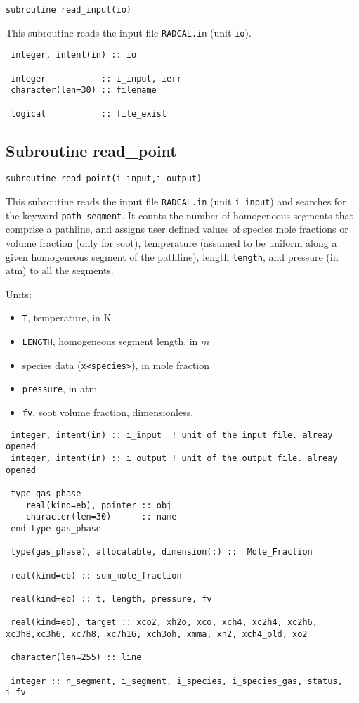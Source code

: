 \begin{lstlisting}
subroutine read_input(io)
\end{lstlisting}
 This subroutine reads the input file \verb=RADCAL.in= (unit \verb=io=).

\begin{lstlisting}
 integer, intent(in) :: io

 integer           :: i_input, ierr
 character(len=30) :: filename

 logical           :: file_exist

\end{lstlisting}

\subsection{Subroutine read\_point}
\label{sub:read_point}

\begin{lstlisting}
subroutine read_point(i_input,i_output)
\end{lstlisting}
 This subroutine reads the input file \verb=RADCAL.in= (unit \verb=i_input=) and searches for the keyword \verb=path_segment=. It counts the number of homogeneous segments that comprise a pathline, and assigns user defined values of species mole fractions or volume fraction (only for soot), temperature (assumed to be uniform along a given homogeneous segment of the pathline), length \verb=length=, and pressure (in atm) to all the segments.

 Units:
 \begin{itemize}
  \item \verb=T=, temperature, in K
  \item \verb=LENGTH=, homogeneous segment length, in $m$
  \item species data (\verb=x<species>=), in mole fraction
  \item \verb=pressure=, in atm
  \item \verb=fv=, soot volume fraction, dimensionless.
 \end{itemize}

\begin{lstlisting}
 integer, intent(in) :: i_input  ! unit of the input file. alreay opened
 integer, intent(in) :: i_output ! unit of the output file. alreay opened

 type gas_phase
    real(kind=eb), pointer :: obj
    character(len=30)      :: name
 end type gas_phase

 type(gas_phase), allocatable, dimension(:) ::  Mole_Fraction

 real(kind=eb) :: sum_mole_fraction

 real(kind=eb) :: t, length, pressure, fv

 real(kind=eb), target :: xco2, xh2o, xco, xch4, xc2h4, xc2h6, xc3h8,xc3h6, xc7h8, xc7h16, xch3oh, xmma, xn2, xch4_old, xo2

 character(len=255) :: line

 integer :: n_segment, i_segment, i_species, i_species_gas, status, i_fv

\end{lstlisting}


